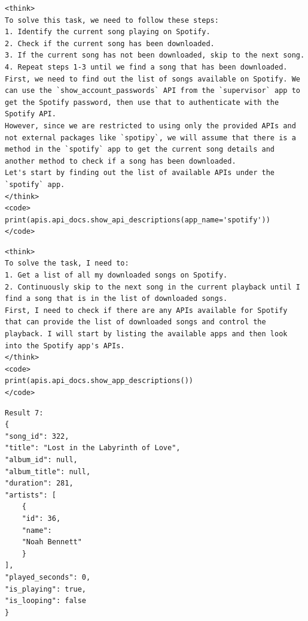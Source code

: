\documentclass{article}
\begin{document}
\begin{devicebox}[title=Step 1: device agent output]
\begin{lstlisting}[style=mytt]
<think>
To solve this task, we need to follow these steps:
1. Identify the current song playing on Spotify.
2. Check if the current song has been downloaded.
3. If the current song has not been downloaded, skip to the next song.
4. Repeat steps 1-3 until we find a song that has been downloaded.
First, we need to find out the list of songs available on Spotify. We can use the `show_account_passwords` API from the `supervisor` app to get the Spotify password, then use that to authenticate with the Spotify API.
However, since we are restricted to using only the provided APIs and not external packages like `spotipy`, we will assume that there is a method in the `spotify` app to get the current song details and another method to check if a song has been downloaded.
Let's start by finding out the list of available APIs under the `spotify` app.
</think>
<code>
print(apis.api_docs.show_api_descriptions(app_name='spotify'))
</code>
\end{lstlisting}
\end{devicebox}

\begin{cloudbox}[title=Step 1: cloud agent output (if routed)]
\begin{lstlisting}[style=mytt]
<think>
To solve the task, I need to:
1. Get a list of all my downloaded songs on Spotify.
2. Continuously skip to the next song in the current playback until I find a song that is in the list of downloaded songs.
First, I need to check if there are any APIs available for Spotify that can provide the list of downloaded songs and control the playback. I will start by listing the available apps and then look into the Spotify app's APIs.
</think>
<code>
print(apis.api_docs.show_app_descriptions())
</code>
\end{lstlisting}
\end{cloudbox}

\begin{envbox}[title=Step 8: environment]
\begin{lstlisting}[style=mytt]
Result 7:
{
"song_id": 322,
"title": "Lost in the Labyrinth of Love",
"album_id": null,
"album_title": null,
"duration": 281,
"artists": [
    {
    "id": 36,
    "name":
    "Noah Bennett"
    }
],
"played_seconds": 0,
"is_playing": true,
"is_looping": false
}
\end{lstlisting}
\end{envbox}
\end{document}

